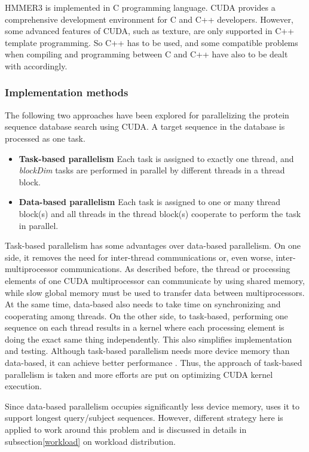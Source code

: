 HMMER3 is implemented in C programming language. CUDA provides a comprehensive development environment for C and C++ developers. However, some advanced features of CUDA, such as texture, are only supported in C++ template programming. So C++ has to be used, and some compatible problems when compiling and programming between C and C++ have also to be dealt with accordingly.

\subsubsection*{Implementation methods}
\label{impl}

The following two approaches have been explored for parallelizing the protein sequence database search using CUDA. A target sequence in the database is processed as one task.

\begin{itemize}
 \item \textbf{Task-based parallelism} Each task is assigned to exactly one thread, and \emph{blockDim} tasks are performed in parallel by different threads in a thread block.
 \item \textbf{Data-based parallelism} Each task is assigned to one or many thread block(s) and all threads in the thread block(s) cooperate to perform the task in parallel.
\end{itemize}

Task-based parallelism has some advantages over data-based parallelism. On one side, it removes the need for inter-thread communications or, even worse, inter-multiprocessor communications. As described before, the thread or processing elements of one CUDA multiprocessor can communicate by using shared memory, while slow global memory must be used to transfer data between multiprocessors. At the same time, data-based also needs to take time on synchronizing and cooperating among threads. On the other side, to task-based, performing one sequence on each thread results in a kernel where each processing element is doing the exact same thing independently. This also simplifies implementation and testing. Although task-based parallelism needs more device memory than data-based, it can achieve better performance \citep{SW++}. Thus, the approach of task-based parallelism is taken and more efforts are put on optimizing CUDA kernel execution.

Since data-based parallelism occupies significantly less device memory, \citep{SW++} uses it to support longest query/subject sequences. However, different strategy here is applied to work around this problem and is discussed in details in subsection\ref{workload} on workload distribution.

